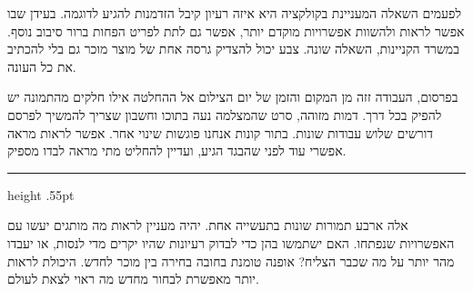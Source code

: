 
\vspace{10mm}

{\fontsize{17.3}{27}\selectfont

לפעמים השאלה המעניינת בקולקציה היא איזה רעיון קיבל הזדמנות להגיע לדוגמה. בעידן שבו אפשר לראות ולהשוות אפשרויות מוקדם יותר, אפשר גם לתת לפריט הפחות ברור סיבוב נוסף. במשרד הקניינות, השאלה שונה. צבע יכול להצדיק גרסה אחת של מוצר מוכר גם בלי להכתיב את כל העונה.

בפרסום, העבודה זזה מן המקום והזמן של יום הצילום אל ההחלטה אילו חלקים מהתמונה יש להפיק בכל דרך. דמות מזוהה, סרט שהמצלמה נעה בתוכו וחשבון שצריך להמשיך לפרסם דורשים שלוש עבודות שונות. בתור קונות אנחנו פוגשות שינוי אחר. אפשר לראות מראה אפשרי עוד לפני שהבגד הגיע, ועדיין להחליט מתי מראה לבדו מספיק.

\par}

\vspace{8mm}

{\color{Silver}\hrule height .55pt}

\vspace{6mm}

{\fontsize{17.3}{27}\selectfont

אלה ארבע תמורות שונות בתעשייה אחת. יהיה מעניין לראות מה מותגים יעשו עם האפשרויות שנפתחו. האם ישתמשו בהן כדי לבדוק רעיונות שהיו יקרים מדי לנסות, או יעבדו מהר יותר על מה שכבר הצליח? אופנה טומנת בחובה בחירה בין מוכר לחדש. היכולת לראות יותר מאפשרת לבחור מחדש מה ראוי לצאת לעולם.

\par}
